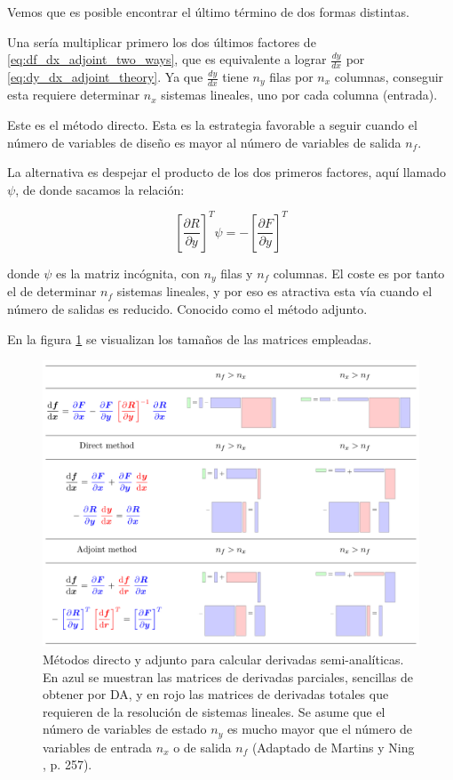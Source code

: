 Vemos que es posible encontrar el último término de dos formas distintas.

Una sería multiplicar primero los dos últimos factores de
\eqref{eq:df_dx_adjoint_two_ways}, que es equivalente a lograr $\frac{dy}{dx}$
por \eqref{eq:dy_dx_adjoint_theory}. Ya que $\frac{dy}{dx}$ tiene $n_y$ filas
por $n_x$ columnas, conseguir esta requiere determinar $n_x$ sistemas lineales,
uno por cada columna (entrada).

Este es el método directo. Esta es la estrategia favorable a seguir cuando el
número de variables de diseño es mayor al número de variables de salida $n_f$.

La alternativa es despejar el producto de los dos primeros factores, aquí llamado
$\psi$, de donde sacamos la relación:

\begin{equation} \label{eq:psi_adjoint_theory}
	\left[ \frac{\partial R}{\partial y} \right]^T \psi = - \left[  \frac{\partial F}{\partial y} \right]^T
\end{equation}

donde $\psi$ es la matriz incógnita, con $n_y$ filas y $n_f$ columnas. El coste
es por tanto el de determinar $n_f$ sistemas lineales, y por eso es atractiva
esta vía cuando el número de salidas es reducido. Conocido como el método
adjunto.

En la figura \ref{fig:direct_adjoint_operations} se visualizan los tamaños de
las matrices empleadas.

\begin{figure}[h]
	\centering
	\includegraphics[width=1\textwidth]{./capitulos/metodologia/images/direct_adjoint_operations.png}
	\caption{Métodos directo y adjunto para calcular derivadas semi-analíticas.
		En azul se muestran las matrices de derivadas parciales, sencillas de obtener
		por DA, y en rojo las matrices de derivadas totales que requieren de la
		resolución de sistemas lineales. Se asume que el número de variables de
		estado $n_y$ es mucho mayor que el número de variables de entrada $n_x$ o de
		salida $n_f$ (Adaptado de Martins y Ning \cite{mdobook}, p. 257).}
	\label{fig:direct_adjoint_operations}
\end{figure}


